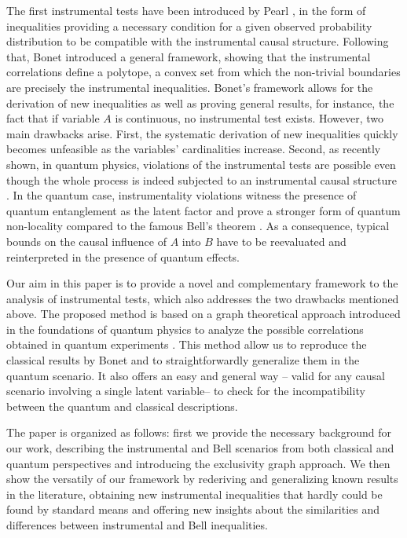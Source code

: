\documentclass[letterpaper]{article}
\begin{document}
The first instrumental tests have been introduced by Pearl \cite{pearl1995}, in
the form of inequalities providing a necessary condition for a given observed
probability distribution to be compatible with the instrumental causal
structure. Following that, Bonet \cite{bonet2001} introduced a general
framework, showing that the instrumental correlations define a polytope, a
convex set from which the non-trivial boundaries are precisely the instrumental
inequalities. Bonet's framework allows for the derivation of new inequalities
as well as proving general results, for instance, the fact that if variable $A$
is continuous, no instrumental test exists. However, two main drawbacks arise. First, the systematic derivation of new inequalities quickly becomes
unfeasible as the variables' cardinalities increase. Second, as recently shown,
in quantum physics, violations of the instrumental tests are possible even
though the whole process is indeed subjected to an instrumental causal structure
\cite{chaves2018, himbeeck2018}. In the quantum case, instrumentality violations
witness the presence of quantum entanglement as the latent factor and prove a
stronger form of quantum non-locality compared to the famous Bell's theorem
\cite{chaves2018}. As a consequence, typical bounds on the causal influence of
$A$ into $B$ have to be reevaluated and reinterpreted in the presence of quantum
effects.

Our aim in this paper is to provide a novel and complementary framework to the
analysis of instrumental tests, which also addresses the two drawbacks mentioned
above. The proposed method is based on a graph theoretical approach introduced
in the foundations of quantum physics to analyze the possible correlations
obtained in quantum experiments \cite{cabello2014,rabelo2014}. This method allow us to reproduce the classical results by Bonet and to straightforwardly generalize them in the quantum scenario. It also offers an easy and general way -- valid for any causal scenario involving a single latent variable-- to check for the incompatibility between the
quantum and classical descriptions.

The paper is organized as follows: first we provide the necessary background for our work, describing the instrumental and Bell scenarios from both classical and quantum perspectives and introducing the exclusivity graph approach. We then show the versatily of our framework by rederiving and generalizing known results in the literature, obtaining new instrumental inequalities that hardly could be found by standard means and offering new insights about the similarities and differences between instrumental and Bell inequalities.
\end{document}
